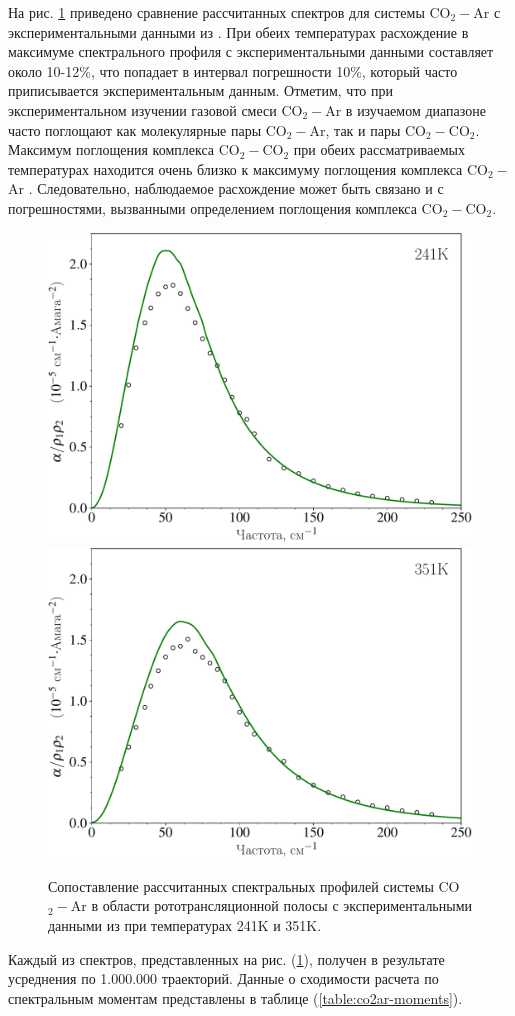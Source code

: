 На рис. \ref{fig:co2ar-spectra} приведено сравнение рассчитанных спектров для системы CO$_2-$Ar с экспериментальными данными из \cite{tonkov1995}. При обеих температурах расхождение в максимуме спектрального профиля с экспериментальными данными составляет около 10-12\%, что попадает в интервал погрешности 10\%, который часто приписывается экспериментальным данным.
Отметим, что при экспериментальном изучении газовой смеси CO$_2-$Ar в изучаемом диапазоне часто поглощают как молекулярные пары CO$_2-$Ar, так и пары CO$_2-$CO$_2$. Максимум поглощения комплекса CO$_2-$CO$_2$ при обеих рассматриваемых температурах находится очень близко к максимуму поглощения комплекса CO$_2-$Ar \cite{gruszka1997}. Следовательно, наблюдаемое расхождение может быть связано и с погрешностями, вызванными определением поглощения комплекса CO$_2-$CO$_2$.

\begin{figure}[H]
    \centering
    \includegraphics[width=0.49\linewidth]{./pictures/polyatom_spectra/co2_ar/241K_russian-crop.pdf}
    \includegraphics[width=0.49\linewidth]{./pictures/polyatom_spectra/co2_ar/351K_russian-crop.pdf}
    \caption{Сопоставление рассчитанных спектральных профилей системы CO$_2-$Ar в области рототрансляционной полосы с экспериментальными данными из \cite{tonkov1995} при температурах 241K и 351K.}
    \label{fig:co2ar-spectra}
\end{figure}

Каждый из спектров, представленных на рис. (\ref{fig:co2ar-spectra}), получен в результате усреднения по 1.000.000 траекторий. Данные о сходимости расчета по спектральным моментам представлены в таблице (\ref{table:co2ar-moments}). 

